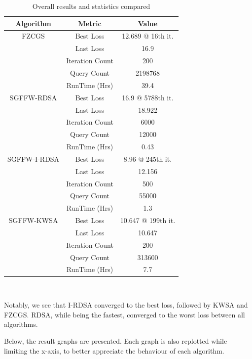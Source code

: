 \documentclass[10pt,twocolumn,letterpaper]{article}
\begin{document}
\begin{table}[h]
   \centering
   \begin{tabular}{ccc}
       \hline
       \textbf{Algorithm} & \textbf{Metric} & \textbf{Value} \\
       \hline
       FZCGS & Best Loss & 12.689 @ 16th it.\\
            & Last Loss & 16.9\\
            & Iteration Count & 200\\
            & Query Count & 2198768\\
            & RunTime (Hrs) & 39.4\\
       \hline
       SGFFW-RDSA & Best Loss & 16.9 @ 5788th it.\\
                  & Last Loss & 18.922\\
                  & Iteration Count & 6000\\
                  & Query Count & 12000\\
                  & RunTime (Hrs) & 0.43\\
       \hline
       SGFFW-I-RDSA & Best Loss & 8.96 @ 245th it.\\
                    & Last Loss & 12.156\\
                    & Iteration Count & 500\\
                    & Query Count & 55000\\
                    & RunTime (Hrs) & 1.3\\
       \hline
       SGFFW-KWSA & Best Loss & 10.647 @ 199th it.\\
                  & Last Loss & 10.647\\
                  & Iteration Count & 200\\
                  & Query Count & 313600\\
                  & RunTime (Hrs) & 7.7\\
       \hline
   \end{tabular}
   \
   \caption{Overall results and statistics compared} 
   \label{tab:overall_results}
\end{table}

Notably, we see that I-RDSA converged to the best loss, followed by KWSA and FZCGS.
RDSA, while being the fastest, converged to the worst loss between all algorithms.

Below, the result graphs are presented. Each graph is also replotted
while limiting the x-axis, to better appreciate the behaviour of each algorithm.
\end{document}
